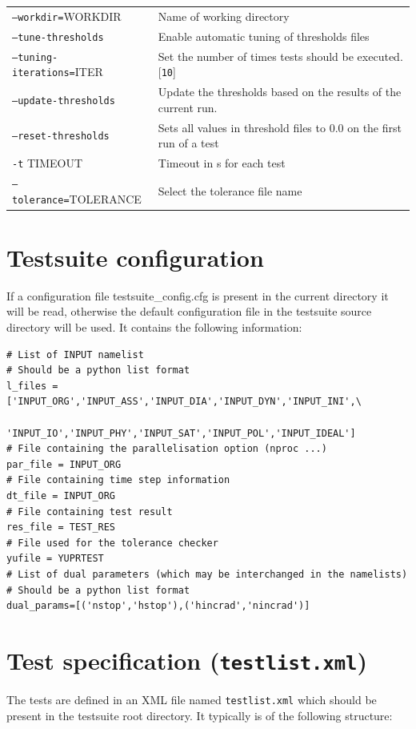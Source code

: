 \documentclass[12pt,twoside,a4paper]{report}
\begin{document}
\begin{longtable}{lp{10cm}}
\texttt{--workdir=}WORKDIR & Name of working directory \\[1.2ex]
\texttt{--tune-thresholds} & Enable automatic tuning of thresholds files \\[1.2ex]
\texttt{--tuning-iterations=}ITER & Set the number of times tests should be executed. [\texttt{10}]\\[1.2ex]
\texttt{--update-thresholds} & Update the thresholds based on the results of the current run. \\[1.2ex]
\texttt{--reset-thresholds} & Sets all values in threshold files to 0.0 on the first run of a test\\[1.2ex]
\texttt{-t} TIMEOUT & Timeout in s for each test\\[1.2ex]
\texttt{--tolerance=}TOLERANCE & Select the tolerance file name\\[1.2ex]
\end{longtable}

\section{Testsuite configuration}
If a configuration file testsuite\_config.cfg is present in the current
directory it will be read, otherwise the default configuration file in the
testsuite source directory will be used. It contains the following
information:
\begin{verbatim}
# List of INPUT namelist 
# Should be a python list format
l_files = ['INPUT_ORG','INPUT_ASS','INPUT_DIA','INPUT_DYN','INPUT_INI',\
                    'INPUT_IO','INPUT_PHY','INPUT_SAT','INPUT_POL','INPUT_IDEAL']
# File containing the parallelisation option (nproc ...)
par_file = INPUT_ORG
# File containing time step information
dt_file = INPUT_ORG
# File containing test result
res_file = TEST_RES
# File used for the tolerance checker
yufile = YUPRTEST
# List of dual parameters (which may be interchanged in the namelists)
# Should be a python list format
dual_params=[('nstop','hstop'),('hincrad','nincrad')]
\end{verbatim}

\newpage
\section{Test specification (\texttt{testlist.xml})}
\label{sec:testlist}
The tests are defined in an XML file named \texttt{testlist.xml} which should be present in the testsuite root directory. It typically is of the following structure:
\end{document}
